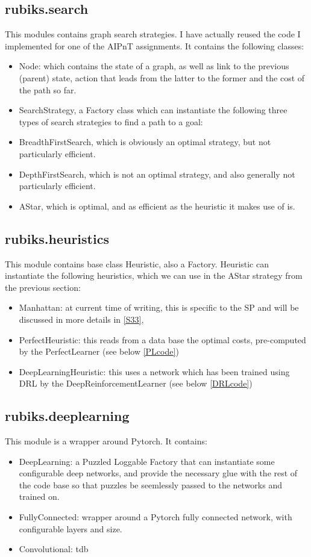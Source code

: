 \subsection{rubiks.search}
This modules contains graph search strategies. I have actually reused the code I implemented for one of the AIPnT assignments. It contains the following classes:
\begin{itemize}
\item Node: which contains the state of a graph, as well as link to the previous (parent) state, action that leads from the latter to the former and the cost of the path so far.
\item SearchStrategy, a Factory class which can instantiate the following three types of search strategies to find a path to a goal:
\item BreadthFirstSearch, which is obviously an optimal strategy, but not particularly efficient.
\item DepthFirstSearch, which is not an optimal strategy, and also generally not particularly efficient.
\item AStar, which is optimal, and as efficient as the heuristic it makes use of is.
\end{itemize}

\subsection{rubiks.heuristics}
\label{HSS}
This module contains base class Heuristic, also a Factory. Heuristic can instantiate the following heuristics, which we can use in the AStar strategy from the previous section:
\begin{itemize}
\item Manhattan: at current time of writing, this is specific to the SP and will be discussed in more details in \ref{S33},
\item PerfectHeuristic: this reads from a data base the optimal costs, pre-computed by the PerfectLearner (see below \ref{PLcode})
\item DeepLearningHeuristic: this uses a network which has been trained using DRL by the DeepReinforcementLearner (see below \ref{DRLcode})
\end{itemize}



\subsection{rubiks.deeplearning}
This module is a wrapper around Pytorch. It contains:
\begin{itemize}
\item DeepLearning: a Puzzled Loggable Factory that can instantiate some configurable deep networks, and provide the necessary glue with the rest of the code base so that puzzles be seemlessly passed to the networks and trained on.
\item FullyConnected: wrapper around a Pytorch fully connected network, with configurable layers and size.
\item Convolutional: tdb
\end{itemize}


